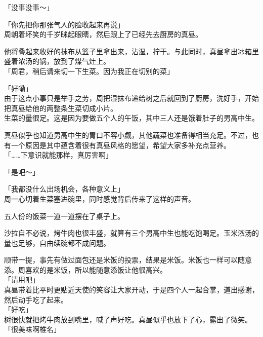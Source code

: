 「没事没事～」

「你先把你那张气人的脸收起来再说」\\

周朝着坏笑的千岁眯起眼睛，然后跟上了已经先去厨房的真昼。

他将叠起来收好的抹布从篮子里拿出来，沾湿，拧干。与此同时，真昼拿出冰箱里盛着浓汤的锅，放到了煤气灶上。\\

「周君，稍后请来切一下生菜。因为我正在切别的菜」

「好嘞」\\

由于这点小事只是举手之劳，周把湿抹布递给树之后就回到了厨房，洗好手，开始把真昼给他的两整条生菜切成小片。\\

生菜的量很足。这是因为要做五个人的午饭，其中三人还是饿着肚子的男高中生。

真昼似乎也知道男高中生的胃口不容小觑，其他蔬菜也准备得相当充足。不过，也有一个原因是其中蕴含着很有真昼风格的愿望，希望大家多补充点营养。\\

「……下意识就能那样，真厉害啊」

「是吧～」

「我都没什么出场机会，各种意义上」\\

周一心切着生菜塞进碗里，同时感觉背后传来了这样的声音。\\

\vspace{2\baselineskip}

五人份的饭菜一道一道摆在了桌子上。

沙拉自不必说，烤牛肉也很丰盛，就算有三个男高中生也能吃饱喝足。玉米浓汤的量也足够，自由续碗都不成问题。

顺带一提，事先有做过面包还是米饭的投票，结果是米饭。米饭也一样可以随意添。周喜欢的是米饭，所以能随意添饭让他很高兴。\\

「请用吧」\\

真昼带着比平时更贴近天使的笑容让大家开动，于是四个人一起合掌，道出感谢，然后动手吃了起来。\\

「好吃」\\

树很快就把烤牛肉放到嘴里，喊了声好吃。真昼似乎也放下了心，露出了微笑。\\

「很美味啊椎名」

